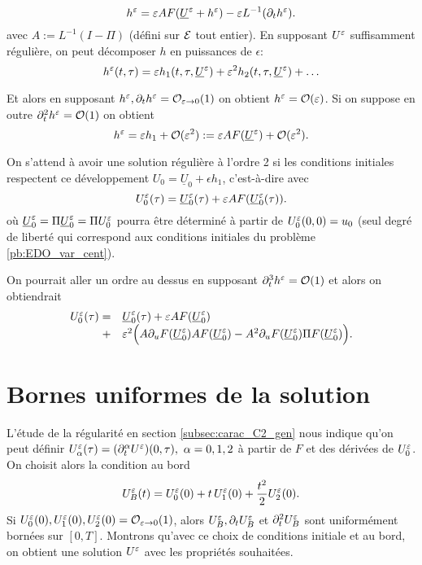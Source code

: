$$ h^{\varepsilon} = \varepsilon A F(\underline{U}^{\varepsilon}+h^{\varepsilon}) - \varepsilon L^{-1}(\partial_t h^{\varepsilon}). $$
avec $A := L^{-1}(I-\Pi)$ (défini sur $\mathcal{E}$ tout entier). En supposant $U^{\varepsilon}$ suffisamment régulière, on peut décomposer $h$ en puissances de $\epsilon$:
$$ h^{\varepsilon}(t,\tau) = \varepsilon h_1(t,\tau,\underline{U}^{\varepsilon}) + \varepsilon^2 h_2(t,\tau,\underline{U}^{\varepsilon}) + \ldots $$

Et alors en supposant $h^{\varepsilon}, \partial_t h^{\varepsilon} = \mathcal{O}_{\varepsilon\rightarrow 0}(1)$ on obtient $h^{\varepsilon} = \mathcal{O}(\varepsilon)$. Si on suppose en outre $\partial_t^2 h^{\varepsilon} = \mathcal{O}(1)$ on obtient 
$$ h^{\varepsilon} = \varepsilon h_1 + \mathcal{O}(\varepsilon^2) := \varepsilon AF(\underline{U}^{\varepsilon}) + \mathcal{O}(\varepsilon^2). $$

\newcommand{\ulU}{\underline{U}}
\newcommand{\ulX}{\underline{X}}
\newcommand{\ulZ}{\underline{Z}}
\newcommand{\ulx}{\underline{x}}
\newcommand{\ulz}{\underline{z}}
\newcommand{\ulf}{\underline{f}}
\newcommand{\ulg}{\underline{g}}

On s'attend à avoir une solution régulière à l'ordre 2 si les conditions initiales respectent ce développement $U_0 = \underline{U}_0 + \epsilon h_1$, c'est-à-dire avec 
\begin{equation}
U_0^{\varepsilon}(\tau) = \underline{U}_0^{\varepsilon}(\tau) + \varepsilon A F(\underline{U}_0^{\varepsilon}(\tau)).
\label{eq:CI_chapman}
\end{equation}
où $\ulU_0\eeps = \Pi \ulU_0\eeps = \Pi U_0\eeps$ pourra être déterminé à partir de $U_0^{\varepsilon}(0,0) = u_0$ (seul degré de liberté qui correspond aux conditions initiales du problème \eqref{pb:EDO_var_cent}). 


\begin{remark}
On pourrait aller un ordre au dessus en supposant $\partial_t^3 h^{\varepsilon} = \mathcal{O}(1)$ et alors on obtiendrait 
$$ \begin{array}{rl}
U_0\eeps(\tau) =& \underline{U}_0\eeps(\tau) + \epsilon A F(\underline{U}_0\eeps) \\
+& \epsilon^2 \Big( A\dpu F(\ulU_0\eeps) A F(\ulU_0\eeps) - A^2 \dpu F(\ulU_0\eeps)\Pi F(\ulU_0\eeps) \Big). 
\end{array} $$
\end{remark}



\section{Bornes uniformes de la solution}

L'étude de la régularité en section \ref{subsec:carac_C2_gen} nous indique qu'on peut définir $U_{\alpha}^{\varepsilon}(\tau) = (\partial_t^{\alpha} U^{\varepsilon})(0,\tau),\ \alpha = 0,1,2$ à partir de $F$ et des dérivées de $U_0^{\varepsilon}$. On choisit alors la condition au bord 
%
\begin{equation}
U_B^{\varepsilon}(t) = U_0^{\varepsilon}(0) + t\, U_1^{\varepsilon}(0) + \dfrac{t^2}{2}U_2^{\varepsilon}(0). 
\label{eq:CB_ord2}
\end{equation}
%
Si $U_0^{\varepsilon}(0), U_1^{\varepsilon}(0), U_2^{\varepsilon}(0) = \mathcal{O}_{\varepsilon\rightarrow0}(1)$, alors $U_B^{\varepsilon},\partial_t U_B^{\varepsilon}$ et $\partial_t^2 U_B^{\varepsilon}$ sont uniformément bornées sur $[0,T]$. 
Montrons qu'avec ce choix de conditions initiale et au bord, on obtient une solution $U^{\varepsilon}$ avec les propriétés souhaitées. 

